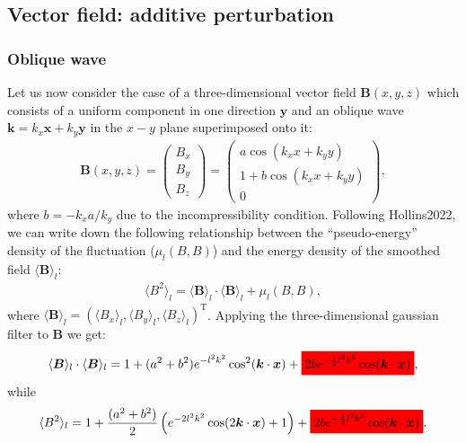 \documentclass[]{article}
\newcommand{\mathcolorbox}[2]{\colorbox{#1}{$\displaystyle #2$}}
\begin{document}
\subsection{Vector field: additive perturbation}

\subsubsection{Oblique wave}

Let us now consider the case of a three-dimensional vector field $\bm B (x,y,z)$  which consists of a uniform component in one direction $\bm y$ and an oblique wave $\bm k = k_x \bm x + k_y \bm y$ in the $x-y$ plane superimposed onto it:
%
\begin{align}
	\bm B (x,y,z) = \begin{pmatrix}
		B_x \\ B_y \\ B_z
	\end{pmatrix} = \begin{pmatrix}
	a \cos \left(k_x x + k_y y\right)  \\ 1 + b \cos \left(k_x x + k_y y\right) \\ 0
	\end{pmatrix},
\end{align}
%
where $b = -k_x a / k_y$ due to the incompressibility condition.
Following Hollins2022, we can write down the following relationship between the ``pseudo-energy'' density of the fluctuation ($\mu_l(B,B)$) and the energy density of the smoothed field $\langle \bm B \rangle_l$:
%
\begin{align}\label{eq:pseudo_energy}
	\langle B^2 \rangle_l = \langle \bm B \rangle_l \cdot \langle \bm B \rangle_l + \mu_l(B,B),
\end{align} 
%
where $\langle \bm B \rangle_l = \left(\langle B_x \rangle_l , \langle B_y \rangle_l, \langle B_z \rangle_l \right)^{\text{T}}$. Applying the three-dimensional gaussian filter to $\bm B$ we get:
%
\begin{align}
	\langle \bm B \rangle_l \cdot \langle \bm B \rangle_l =  1 + (a^2 + b^2) e^{- l^2 k^2} \cos^2 (\bm k \cdot \bm x) + \mathcolorbox{red}{2b e^{-\frac{1}{2} l^2 k^2} \cos (\bm k \cdot \bm x)} ,
\end{align}
%
while 
%
\begin{align}
	\langle B^2 \rangle_l = 1 + \frac{(a^2 + b^2)}{2}  \left(e^{-2 l^2 k^2} \cos (2 \bm k \cdot \bm x)+1\right) + \mathcolorbox{red}{2b e^{-\frac{1}{2} l^2 k^2} \cos (\bm k \cdot \bm x)}.
\end{align}
\end{document}
